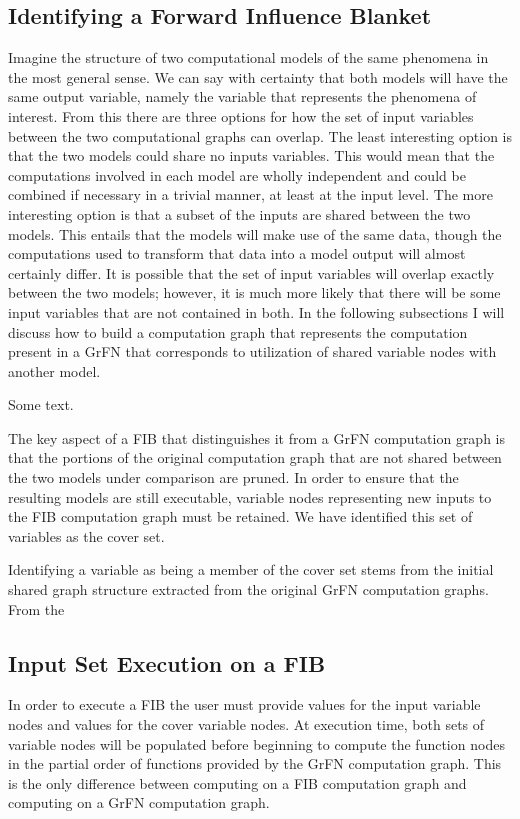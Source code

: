 \subsection{Identifying a Forward Influence Blanket\label{sec:fib_creation}}
Imagine the structure of two computational models of the same phenomena in the most general sense. We can say with certainty that both models will have the same output variable, namely the variable that represents the phenomena of interest. From this there are three options for how the set of input variables between the two computational graphs can overlap. The least interesting option is that the two models could share no inputs variables. This would mean that the computations involved in each model are wholly independent and could be combined if necessary in a trivial manner, at least at the input level. The more interesting option is that a subset of the inputs are shared between the two models. This entails that the models will make use of the same data, though the computations used to transform that data into a model output will almost certainly differ. It is possible that the set of input variables will overlap exactly between the two models; however, it is much more likely that there will be some input variables that are not contained in both. In the following subsections I will discuss how to build a computation graph that represents the computation present in a GrFN that corresponds to utilization of shared variable nodes with another model.

Some text.

The key aspect of a FIB that distinguishes it from a GrFN computation graph is that the portions of the original computation graph that are not shared between the two models under comparison are pruned. In order to ensure that the resulting models are still executable, variable nodes representing new inputs to the FIB computation graph must be retained. We have identified this set of variables as the cover set.

Identifying a variable as being a member of the cover set stems from the initial shared graph structure extracted from the original GrFN computation graphs. From the

\subsection{Input Set Execution on a FIB\label{sec:fib_exec}}
In order to execute a FIB the user must provide values for the input variable nodes and values for the cover variable nodes. At execution time, both sets of variable nodes will be populated before beginning to compute the function nodes in the partial order of functions provided by the GrFN computation graph. This is the only difference between computing on a FIB computation graph and computing on a GrFN computation graph.

